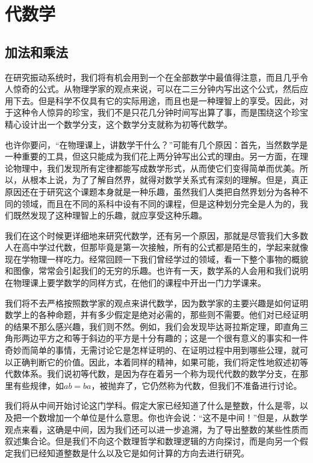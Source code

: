 \chapter{代数学}

\section{加法和乘法}

在研究振动系统时，我们将有机会用到一个在全部数学中最值得注意，而且几乎令人惊奇的公式。从物理学家的观点来说，可以在二三分钟内写出这个公式，然后应用下去。但是科学不仅具有它的实际用途，而且也是一种理智上的享受。因此，对于这种令人惊异的珍宝，我们不是只花几分钟时间写出算了事，而是围绕这个珍宝精心设计出一个数学分支，这个数学分支就称为初等代数学。

也许你要问，“在物理课上，讲数学干什么？”可能有几个原因：首先，当然数学是一种重要的工具，但这只能成为我们花上两分钟写出公式的理由。另一方面，在理论物理中，我们发现所有定律都能写成数学形式，从而使它们变得简单而优美。所以，从根本上说，为了了解自然界，就得对数学关系式有深刻的理解。但是，真正原因还在于研究这个课题本身就是一种乐趣，虽然我们人类把自然界划分为各种不同的领域，而且在不同的系科中设有不同的课程，但是这种划分完全是人为的，我们既然发现了这种理智上的乐趣，就应享受这种乐趣。

我们在这个时候更详细地来研究代数学，还有另一个原因，那就是尽管我们大多数人在高中学过代数，但那毕竟是第一次接触，所有的公式都是陌生的，学起来就像现在学物理一样吃力。经常回顾一下我们曾经学过的领域，看一下整个事物的概貌和图像，常常会引起我们的无穷的乐趣。也许有一天，数学系的人会用和我们说明在物理课上要学数学的同样方式，在他们的课程中开出一门力学课来。

我们将不去严格按照数学家的观点来讲代数学，因为数学家的主要兴趣是如何证明数学上的各种命题，并有多少假定是绝对必需的，那些则不需要。他们对已经证明的结果不那么感兴趣，我们则不然。例如，我们会发现毕达哥拉斯定理，即直角三角形两边平方之和等于斜边的平方是十分有趣的；这是一个很有意义的事实和一件奇妙而简单的事情，无需讨论它是怎样证明的、在证明过程中用到哪些公理，就可以正确判断它的价值。因此，本着同样的精神，如果可能，我们将定性地叙述初等代数体系。我们说初等代数，是因为存在着另一个称为现代代数的数学分支，在那里有些规律，如$ab=ba$，被抛弃了，它仍然称为代数，但我们不准备进行讨论。

我们将从中间开始讨论这门学科。假定大家已经知道了什么是整数，什么是零，以及把一个数增加一个单位是什么意思。你也许会说：“这不是中间！”但是，从数学观点来看，这确是中间，因为我们还可以进一步追溯，为了导出整数的某些性质而叙述集合论。但是我们不向这个数理哲学和数理逻辑的方向探讨，而是向另一个假定我们已经知道整数是什么以及它是如何计算的方向去进行研究。

